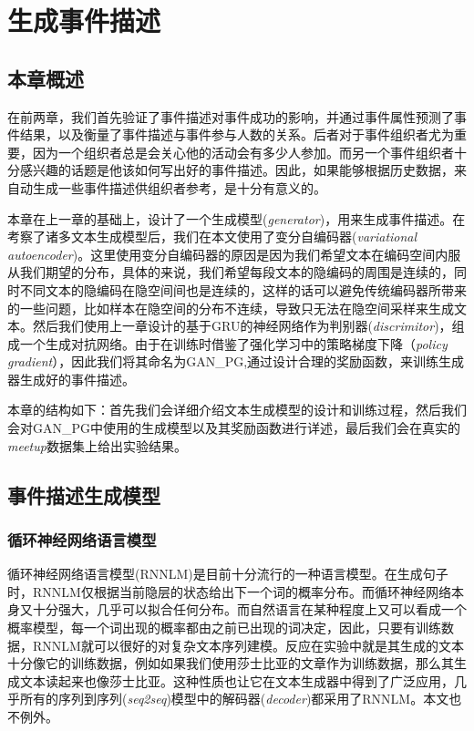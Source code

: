 \documentclass[]{template}
\begin{document}
\section{生成事件描述}

\subsection{本章概述}
在前两章，我们首先验证了事件描述对事件成功的影响，并通过事件属性预测了事件结果，以及衡量了事件描述与事件参与人数的关系。后者对于事件组织者尤为重要，因为一个组织者总是会关心他的活动会有多少人参加。而另一个事件组织者十分感兴趣的话题是他该如何写出好的事件描述。因此，如果能够根据历史数据，来自动生成一些事件描述供组织者参考，是十分有意义的。

本章在上一章的基础上，设计了一个生成模型(\textit{generator})，用来生成事件描述。在考察了诸多文本生成模型后，我们在本文使用了变分自编码器\cite{kingma_auto-encoding_2013,bowman_generating_2015}(\textit{variational autoencoder})。这里使用变分自编码器的原因是因为我们希望文本在编码空间内服从我们期望的分布，具体的来说，我们希望每段文本的隐编码的周围是连续的，同时不同文本的隐编码在隐空间间也是连续的，这样的话可以避免传统编码器所带来的一些问题，比如样本在隐空间的分布不连续，导致只无法在隐空间采样来生成文本。然后我们使用上一章设计的基于GRU的神经网络作为判别器(\textit{discrimitor})，组成一个生成对抗网络\cite{goodfellow_generative_2014}。由于在训练时借鉴了强化学习中的策略梯度下降（\textit{policy gradient}），因此我们将其命名为GAN\_PG,通过设计合理的奖励函数，来训练生成器生成好的事件描述。

本章的结构如下：首先我们会详细介绍文本生成模型的设计和训练过程，然后我们会对GAN\_PG中使用的生成模型以及其奖励函数进行详述，最后我们会在真实的\textit{meetup}数据集上给出实验结果。

\subsection{事件描述生成模型}
\subsubsection{循环神经网络语言模型}
循环神经网络语言模型(RNNLM\cite{mikolov_rnnlm_2011})是目前十分流行的一种语言模型。在生成句子时，RNNLM仅根据当前隐层的状态给出下一个词的概率分布。而循环神经网络本身又十分强大，几乎可以拟合任何分布。而自然语言在某种程度上又可以看成一个概率模型，每一个词出现的概率都由之前已出现的词决定，因此，只要有训练数据，RNNLM就可以很好的对复杂文本序列建模。反应在实验中就是其生成的文本十分像它的训练数据，例如如果我们使用莎士比亚的文章作为训练数据，那么其生成文本读起来也像莎士比亚。这种性质也让它在文本生成器中得到了广泛应用，几乎所有的序列到序列(\textit{seq2seq})模型中的解码器(\textit{decoder})都采用了RNNLM。本文也不例外。
\end{document}
